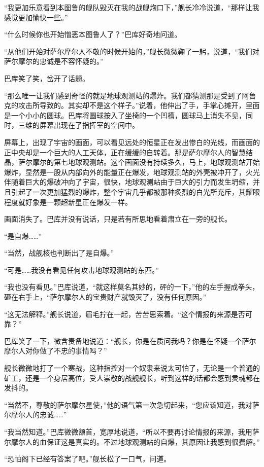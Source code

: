 “我更加乐意看到本图鲁的舰队毁灭在我的战舰炮口下，”舰长冷冷说道，“那样让我感觉更加愉快一些。” 

“什么时候你也开始憎恶本图鲁人了？”巴库好奇地问道。 

“从他们开始对萨尔摩尔人不敬的时候开始的，”舰长微微鞠了一躬，说道，“我们对萨尔摩尔的忠诚是不容怀疑的。” 

巴库笑了笑，岔开了话题。 

“那么唯一让我们感到奇怪的就是地球观测站的爆炸。我们都猜测那是受到了阿鲁克的攻击所导致的。其实却不是这个样子。”说着，他伸出了手，手掌心摊开，里面是一个小小的圆球。巴库将圆球按入了坐椅的一个凹槽，圆球马上消失不见，同时，三维的屏幕出现在了指挥室的空间中。 

屏幕上，出现了宇宙的画面，可以看见远处的恒星正在发出惨白的光线，而画面的正中央却是一个巨大的人工天体，正在缓缓的自转着。那是萨尔摩尔人的智慧结晶，萨尔摩尔的第七地球观测站。这个画面没有持续多久，马上，地球观测站开始爆炸，显然是一股从内部向外的能量正在爆发，地球观测站的外壳被冲开了，火光伴随着巨大的爆破冲向了宇宙，很快，地球观测站由于巨大的引力而发生坍缩，并且引起了一次更加猛烈的爆炸，整个宇宙几乎都被那种炙烈的白光所充斥，其耀眼程度就好象是一颗超新星正在爆发一样。 

画面消失了。巴库并没有说话，只是若有所思地看着肃立在一旁的舰长。 

“是自爆……” 

“当然，战舰核也判断出了是自爆。” 

“可是……我没有看见任何攻击地球观测站的东西。” 

“我也没有看见。”巴库说道，“就这样莫名其妙的，砰的一下，”他的左手握成拳头，砸在右手上，“萨尔摩尔人的宝贵财产就毁灭了，没有任何原因。” 

“这无法解释。”舰长说道，眉毛拧在一起，苦苦思索着。“这个情报的来源是否可靠？” 

巴库笑了一下，微含责备地说道：“舰长，你是在质问我吗？你是在怀疑一个萨尔摩尔人对你做了不忠的事情吗？” 

舰长微微地打了一个寒战，这种指控对一个奴隶来说太可怕了，无论是一个普通的矿工，还是一个身居高位，受人崇敬的战舰舰长，听到这样的话都会感到灵魂都在发抖的。 

“当然不，尊敬的萨尔摩尔星使，”他的语气第一次急切起来，“您应该知道，我对萨尔摩尔人的忠诚……” 

“我当然知道。”巴库微微颔首，宽厚地说道，“所以不要再讨论情报的来源，我用萨尔摩尔人的血保证这是真实的。不过地球观测站的自爆，其原因让我感到很费解。” 

“恐怕阁下已经有答案了吧。”舰长松了一口气，问道。 

